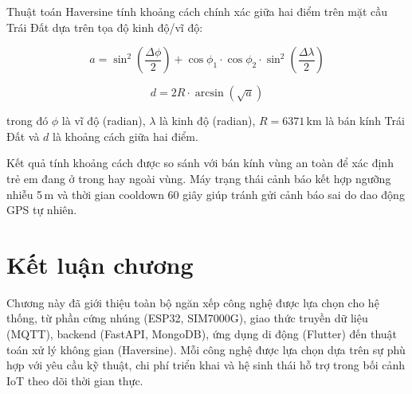 \documentclass[../DoAn.tex]{subfiles}
\begin{document}
Thuật toán Haversine tính khoảng cách chính xác giữa hai điểm trên mặt cầu Trái Đất dựa trên tọa độ kinh độ/vĩ độ:

\begin{equation}
  a = \sin^2\!\left(\frac{\Delta\phi}{2}\right) + \cos\phi_1 \cdot \cos\phi_2 \cdot \sin^2\!\left(\frac{\Delta\lambda}{2}\right)
\end{equation}

\begin{equation}
  d = 2R \cdot \arcsin\!\left(\sqrt{a}\right)
\end{equation}

trong đó $\phi$ là vĩ độ (radian), $\lambda$ là kinh độ (radian), $R = 6371$\,km là bán kính Trái Đất và $d$ là khoảng cách giữa hai điểm.

Kết quả tính khoảng cách được so sánh với bán kính vùng an toàn để xác định trẻ em đang ở trong hay ngoài vùng. Máy trạng thái cảnh báo kết hợp ngưỡng nhiễu 5\,m và thời gian cooldown 60 giây giúp tránh gửi cảnh báo sai do dao động GPS tự nhiên.

\section{Kết luận chương}

Chương này đã giới thiệu toàn bộ ngăn xếp công nghệ được lựa chọn cho hệ thống, từ phần cứng nhúng (ESP32, SIM7000G), giao thức truyền dữ liệu (MQTT), backend (FastAPI, MongoDB), ứng dụng di động (Flutter) đến thuật toán xử lý không gian (Haversine). Mỗi công nghệ được lựa chọn dựa trên sự phù hợp với yêu cầu kỹ thuật, chi phí triển khai và hệ sinh thái hỗ trợ trong bối cảnh IoT theo dõi thời gian thực.
\end{document}
